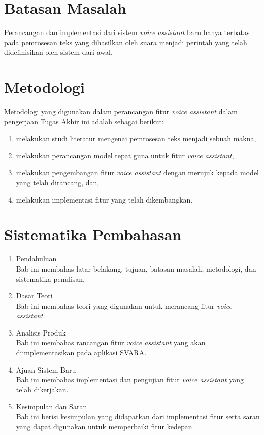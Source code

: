 \section{Batasan Masalah}

Perancangan dan implementasi dari sistem \textit{voice assistant} baru hanya terbatas pada pemrosesan teks yang dihasilkan oleh suara menjadi perintah yang telah didefinisikan oleh sistem dari awal.

\section{Metodologi}

Metodologi yang digunakan dalam perancangan fitur \textit{voice assistant} dalam pengerjaan Tugas Akhir ini adalah sebagai berikut:

\begin{enumerate}
	\item melakukan studi literatur mengenai pemrosesan teks menjadi sebuah makna,
	\item melakukan perancangan model tepat guna untuk fitur \textit{voice assistant},
	\item melakukan pengembangan fitur \textit{voice assistant} dengan merujuk kepada model yang telah dirancang, dan,
	\item melakukan implementasi fitur yang telah dikembangkan. 
\end{enumerate}

\section{Sistematika Pembahasan}

\begin{enumerate}[label=Bab \arabic*,itemindent=*]
	\item Pendahuluan\\
	Bab ini membahas latar belakang, tujuan, batasan masalah, metodologi, dan sistematika penulisan.
	\item Dasar Teori\\
	Bab ini membahas teori yang digunakan untuk merancang fitur \textit{voice assistant}.
	\item Analisis Produk\\
	Bab ini membahas rancangan fitur \textit{voice assistant} yang akan diimplementasikan pada aplikasi SVARA.
	\item Ajuan Sistem Baru\\
	Bab ini membahas implementasi dan pengujian fitur \textit{voice assistant} yang telah dikerjakan.
	\item Kesimpulan dan Saran\\
	Bab ini berisi kesimpulan yang didapatkan dari implementasi fitur serta saran yang dapat digunakan untuk memperbaiki fitur kedepan.
\end{enumerate}
